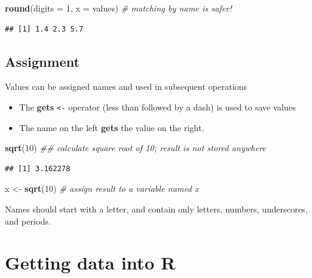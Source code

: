 \documentclass[]{book}
\newenvironment{Shaded}{\begin{snugshade}}{\end{snugshade}}
\newcommand{\CommentTok}[1]{\textcolor[rgb]{0.56,0.35,0.01}{\textit{#1}}}
\newcommand{\DataTypeTok}[1]{\textcolor[rgb]{0.13,0.29,0.53}{#1}}
\newcommand{\DecValTok}[1]{\textcolor[rgb]{0.00,0.00,0.81}{#1}}
\newcommand{\KeywordTok}[1]{\textcolor[rgb]{0.13,0.29,0.53}{\textbf{#1}}}
\newcommand{\NormalTok}[1]{#1}
\newcommand{\StringTok}[1]{\textcolor[rgb]{0.31,0.60,0.02}{#1}}
\providecommand{\tightlist}{%
  \setlength{\itemsep}{0pt}\setlength{\parskip}{0pt}}
\begin{document}
\begin{Shaded}
\begin{Highlighting}[]
\KeywordTok{round}\NormalTok{(}\DataTypeTok{digits =} \DecValTok{1}\NormalTok{, }\DataTypeTok{x =}\NormalTok{ values) }\CommentTok{# matching by name is safer!}
\end{Highlighting}
\end{Shaded}

\begin{verbatim}
## [1] 1.4 2.3 5.7
\end{verbatim}

\hypertarget{assignment}{%
\subsection{Assignment}\label{assignment}}

Values can be assigned names and used in subsequent operations

\begin{itemize}
\tightlist
\item
  The \textbf{gets} \texttt{\textless{}-} operator (less than followed by a dash) is used to save values
\item
  The name on the left \textbf{gets} the value on the right.
\end{itemize}

\begin{Shaded}
\begin{Highlighting}[]
\KeywordTok{sqrt}\NormalTok{(}\DecValTok{10}\NormalTok{) }\CommentTok{## calculate square root of 10; result is not stored anywhere}
\end{Highlighting}
\end{Shaded}

\begin{verbatim}
## [1] 3.162278
\end{verbatim}

\begin{Shaded}
\begin{Highlighting}[]
\NormalTok{x <-}\StringTok{ }\KeywordTok{sqrt}\NormalTok{(}\DecValTok{10}\NormalTok{) }\CommentTok{# assign result to a variable named x}
\end{Highlighting}
\end{Shaded}

Names should start with a letter, and contain only letters, numbers, underscores, and periods.

\hypertarget{getting-data-into-r}{%
\section{Getting data into R}\label{getting-data-into-r}}
\end{document}
